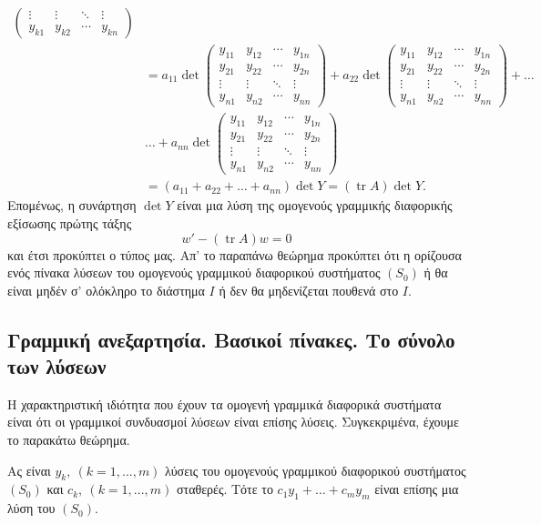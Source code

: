 \documentclass[11pt,a4paper,twoside]{book}
\newcommand{\titlefont}[1]{{\fontfamily{maksf}\selectfont #1}}
\DeclareMathOperator{\tr}{tr}
\newcounter{thewrhma}[chapter]
\renewcommand{\thethewrhma}{\thechapter.\arabic{thewrhma}}
\newcommand{\thewr}{\refstepcounter{thewrhma}{\bf\titlefont{\textcolor{secondarycolor}{\large Θεώρημα\hspace{2mm}\thethewrhma}}}\hspace{1mm}}{}
\newenvironment{Thewrhma}[1]
{\begin{tcolorbox}[title=\thewr\ \ :\ \  {\textcolor{black}{\bf{\large\titlefont{#1}}}},
breakable,
enhanced standard,
titlerule=-.2pt,
toprule=0pt, 
rightrule=0pt, 
bottomrule=0pt,
colback=white,
left=2mm,
top=1mm,
bottom=0mm,
boxrule=0pt,
colframe=white,
borderline west={1.5mm}{0pt}{secondarycolor},
leftrule=2mm,
sharp corners,
coltitle=secondarycolor]}
{\end{tcolorbox}}
\begin{document}
\begin{align*}
\begin{pmatrix}
\vdots & \vdots & \ddots & \vdots \\
y_{k1} & y_{k2} & \cdots & y_{kn}
\end{pmatrix} \\
&= a_{11} \det
\begin{pmatrix}
y_{11} & y_{12} & \cdots & y_{1n} \\
y_{21} & y_{22} & \cdots & y_{2n} \\
\vdots & \vdots & \ddots & \vdots \\
y_{n1} & y_{n2} & \cdots & y_{nn}
\end{pmatrix}
+ a_{22} \det
\begin{pmatrix}
y_{11} & y_{12} & \cdots & y_{1n} \\
y_{21} & y_{22} & \cdots & y_{2n} \\
\vdots & \vdots & \ddots & \vdots \\
y_{n1} & y_{n2} & \cdots & y_{nn}
\end{pmatrix}
+ \dots \\
&\dots + a_{nn} \det
\begin{pmatrix}
y_{11} & y_{12} & \cdots & y_{1n} \\
y_{21} & y_{22} & \cdots & y_{2n} \\
\vdots & \vdots & \ddots & \vdots \\
y_{n1} & y_{n2} & \cdots & y_{nn}
\end{pmatrix} \\
&= (a_{11}+a_{22}+\dots+a_{nn}) \det Y = (\tr A) \det Y.
\end{align*}
Επομένως, η συνάρτηση $\det Y$ είναι μια λύση της ομογενούς γραμμικής διαφορικής εξίσωσης πρώτης τάξης
\[ w' - (\tr A)w = 0 \]
και έτσι προκύπτει ο τύπος μας. Απ' το παραπάνω θεώρημα προκύπτει ότι η ορίζουσα ενός πίνακα λύσεων του ομογενούς γραμμικού διαφορικού συστήματος $(S_0)$ ή θα είναι μηδέν σ' ολόκληρο το διάστημα $Ι$ ή δεν θα μηδενίζεται πουθενά στο $Ι$.
\subsection{Γραμμική ανεξαρτησία. Βασικοί πίνακες. Το σύνολο των λύσεων}

Η χαρακτηριστική ιδιότητα που έχουν τα ομογενή γραμμικά διαφορικά συστήματα είναι ότι οι γραμμικοί συνδυασμοί λύσεων είναι επίσης λύσεις. Συγκεκριμένα, έχουμε το παρακάτω θεώρημα.

\begin{Thewrhma}{}
Ας είναι $y_k,\ (k=1,...,m)$ λύσεις του ομογενούς γραμμικού διαφορικού συστήματος $(S_0)$ και $c_k,\ (k=1,...,m)$ σταθερές. Τότε το $c_1 y_1 + \dots + c_m y_m$ είναι επίσης μια λύση του $(S_0)$.
\end{Thewrhma}
\end{document}
